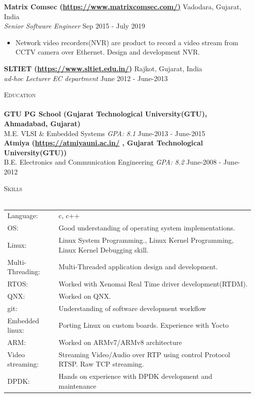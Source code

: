 \documentclass[a4paper]{article}
\newcommand{\lineunder} {
    \vspace*{-8pt} \\
    \hspace*{-18pt} \hrulefill \\
}
\newcommand{\header} [1] {
    {\hspace*{-18pt}\vspace*{6pt} \textsc{#1}}
    \vspace*{-6pt} \lineunder
}
\begin{document}
\textbf{Matrix Comsec (\url{https://www.matrixcomsec.com/)}} \hfill Vadodara, Gujarat, India\\
\textit{Senior Software Engineer} \hfill Sep 2015 - July 2019\\
\vspace{-1mm}
\begin{itemize} \itemsep 1pt
	\item Network video recorders(NVR) are product to record a video stream from CCTV camera over Ethernet. Design and development NVR.
\end{itemize}

\textbf{SLTIET (\url{https://www.sltiet.edu.in/})} \hfill Rajkot, Gujarat, India\\
\textit{ad-hoc Lecturer EC department} \hfill June 2012 - June-2013 \\
\vspace{2mm}

\header{Education}
\textbf{GTU PG School (Gujarat Technological University(GTU), Ahmadabad, Gujarat)}\\
M.E. VLSI \& Embedded Systems \textit{GPA: 8.1} \hfill June-2013 - June-2015\\
\vspace{2mm}
\textbf{Atmiya (\url{https://atmiyauni.ac.in/} , Gujarat Technological University(GTU))}\\
B.E. Electronics and Communication Engineering \textit{GPA: 8.2} \hfill June-2008 - June-2012\\
\vspace{2mm}

\header{Skills}
\begin{tabular}{ l l }
	Language:        & c, c++                                                                             \\
	OS:              & Good understanding of operating system implementations.                            \\
	Linux:           & Linux System Programming., Linux Kernel Programming, Linux Kernel Debugging skill. \\
	Multi-Threading: & Multi-Threaded application design and development.                                 \\
	RTOS:            & Worked with Xenomai Real Time driver development(RTDM).                            \\
	QNX:			  & Worked on QNX. 																		 \\
	git:             & Understanding of software development workflow                                     \\
	Embedded linux:  & Porting Linux on custom boards. Experience with Yocto                              \\
	ARM:			 & Worked on ARMv7/ARMv8 architecture 														 \\
	Video streaming: & Streaming Video/Audio over RTP using control Protocol RTSP. Raw TCP streaming.     \\
	DPDK: & Hands on experience with DPDK development and maintenance \\
\end{tabular}
\vspace{2mm}
\end{document}

